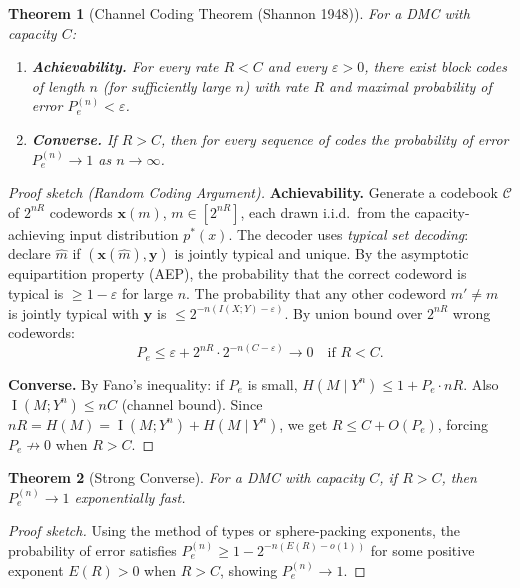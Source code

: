 \documentclass[12pt,a4paper]{amsart}
\newtheorem{theorem}{Theorem}[section]
\theoremstyle{definition}
\theoremstyle{remark}
\DeclareMathOperator{\MI}{I}
\begin{document}
\begin{theorem}[Channel Coding Theorem (Shannon 1948)]\label{thm:channel-coding}
For a DMC with capacity $C$:
\begin{enumerate}[label=(\alph*)]
  \item \textbf{Achievability.} For every rate $R < C$ and every $\varepsilon > 0$,
        there exist block codes of length $n$ (for sufficiently large $n$) with
        rate $R$ and maximal probability of error $P_e^{(n)} < \varepsilon$.
  \item \textbf{Converse.} If $R > C$, then for every sequence of codes the
        probability of error $P_e^{(n)} \to 1$ as $n \to \infty$.
\end{enumerate}
\end{theorem}
\begin{proof}[Proof sketch (Random Coding Argument)]
\textbf{Achievability.} Generate a codebook $\mathcal{C}$ of $2^{nR}$ codewords
$\mathbf{x}(m)$, $m \in [2^{nR}]$, each drawn i.i.d.\ from the capacity-achieving
input distribution $p^*(x)$. The decoder uses \emph{typical set decoding}:
declare $\hat{m}$ if $(\mathbf{x}(\hat{m}), \mathbf{y})$ is jointly typical and
unique. By the asymptotic equipartition property (AEP), the probability that the
correct codeword is typical is $\geq 1-\varepsilon$ for large $n$. The probability
that any other codeword $m' \neq m$ is jointly typical with $\mathbf{y}$ is
$\leq 2^{-n(I(X;Y)-\varepsilon)}$. By union bound over $2^{nR}$ wrong codewords:
\[
  P_e \leq \varepsilon + 2^{nR} \cdot 2^{-n(C-\varepsilon)} \to 0 \quad \text{if } R < C.
\]

\textbf{Converse.} By Fano's inequality: if $P_e$ is small,
$H(M \mid Y^n) \leq 1 + P_e \cdot nR$. Also $\MI(M; Y^n) \leq nC$ (channel
bound). Since $nR = H(M) = \MI(M;Y^n) + H(M\mid Y^n)$, we get $R \leq C + O(P_e)$,
forcing $P_e \not\to 0$ when $R > C$.
\end{proof}

\begin{theorem}[Strong Converse]\label{thm:strong-converse}
For a DMC with capacity $C$, if $R > C$, then $P_e^{(n)} \to 1$ exponentially fast.
\end{theorem}
\begin{proof}[Proof sketch]
Using the method of types or sphere-packing exponents, the probability of error
satisfies $P_e^{(n)} \geq 1 - 2^{-n(E(R) - o(1))}$ for some positive exponent
$E(R)>0$ when $R>C$, showing $P_e^{(n)} \to 1$.
\end{proof}
\end{document}
